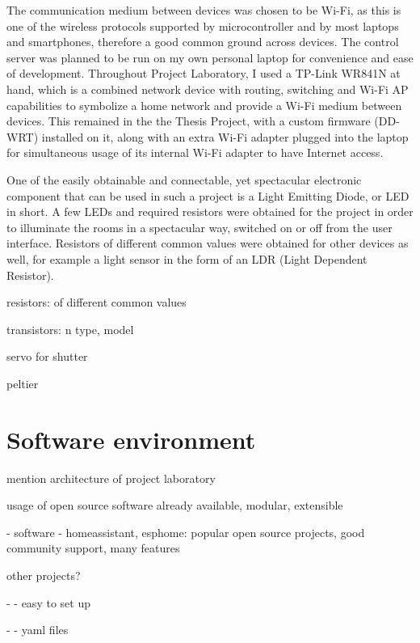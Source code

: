 The communication medium between devices was chosen to be Wi-Fi, as this is one of the wireless protocols supported by microcontroller and by most laptops and smartphones, therefore a good common ground across devices. The control server was planned to be run on my own personal laptop for convenience and ease of development. Throughout Project Laboratory, I used a TP-Link WR841N at hand, which is a combined network device with routing, switching and Wi-Fi AP capabilities to symbolize a home network and provide a Wi-Fi medium between devices. This remained in the the Thesis Project, with a custom firmware (DD-WRT) installed on it, along with an extra Wi-Fi adapter plugged into the laptop for simultaneous usage of its internal Wi-Fi adapter to have Internet access.

One of the easily obtainable and connectable, yet spectacular electronic component that can be used in such a project is a Light Emitting Diode, or LED in short. A few LEDs and required resistors were obtained for the project in order to illuminate the rooms in a spectacular way, switched on or off from the user interface. Resistors of different common values were obtained for other devices as well, for example a light sensor in the form of an LDR (Light Dependent Resistor).

resistors: of different common values

transistors: n type, model

servo for shutter

peltier

\section{Software environment}

mention architecture of project laboratory

usage of open source software already available, modular, extensible

- software - homeassistant, esphome: popular open source projects, good community support, many features

other projects?

- - easy to set up

- - yaml files
